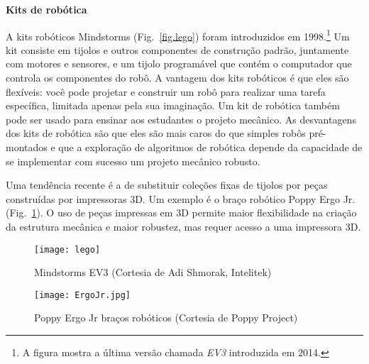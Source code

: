 %
%
%
\smallskip

\noindent\textbf{Kits de robótica}

A \lego{} kits robóticos Mindstorms (Fig.~\ref{fig.lego}) foram introduzidos em 1998.\footnote{A figura mostra a última versão chamada \emph{EV3} introduzida em 2014.} Um kit consiste em tijolos e outros componentes de construção padrão, juntamente com motores e sensores, e um tijolo programável que contém o computador que controla os componentes do robô. A vantagem dos kits robóticos é que eles são flexíveis: você pode projetar e construir um robô para realizar uma tarefa específica, limitada apenas pela sua imaginação. Um kit de robótica também pode ser usado para ensinar aos estudantes o projeto mecânico. As desvantagens dos kits de robótica são que eles são mais caros do que simples robôs pré-montados e que a exploração de algoritmos de robótica depende da capacidade de se implementar com sucesso um projeto mecânico robusto.

Uma tendência recente é a de substituir coleções fixas de tijolos por peças construídas por impressoras 3D. Um exemplo é o braço robótico Poppy Ergo Jr. (Fig.~\ref{fig.poppy}). O uso de peças impressas em 3D permite maior flexibilidade na criação da estrutura mecânica e maior robustez, mas requer acesso a uma impressora 3D. 

\begin{figure}
\begin{minipage}{.45\textwidth}
\begin{center}
\texttt{[image: lego]}
\end{center}
\caption{\lego{} Mindstorms EV3 (Cortesia de Adi Shmorak, Intelitek)}
\label{fig.lego}
\end{minipage}
\hspace{\fill}
\begin{minipage}{.45\textwidth}
\begin{center}
\texttt{[image: ErgoJr.jpg]}
\end{center}
\caption{Poppy Ergo Jr braços robóticos (Cortesia de Poppy Project)}
\label{fig.poppy}
\end{minipage}
\end{figure}


